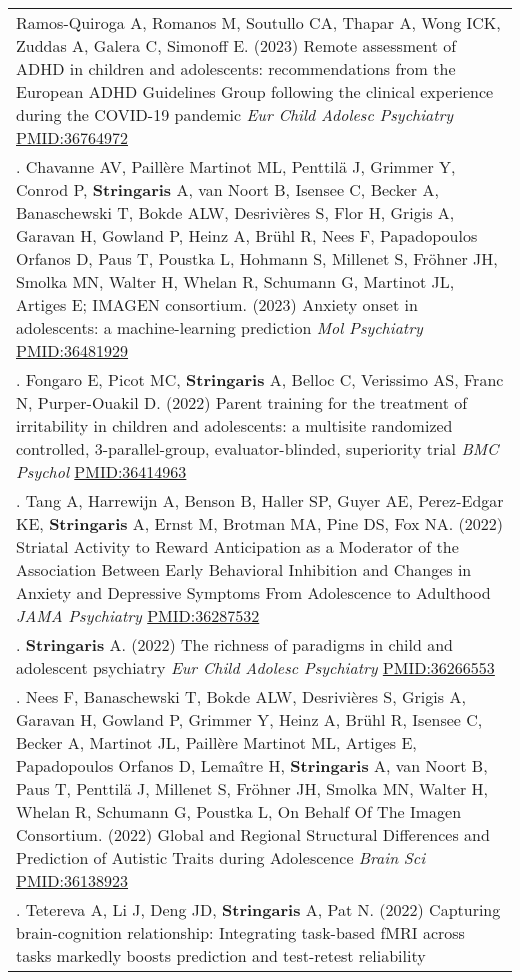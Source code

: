 \documentclass[
]{article}
\begin{document}
\begin{longtable}[]{@{}
  >{\raggedright\arraybackslash}p{}@{}}
Ramos-Quiroga A, Romanos M, Soutullo CA, Thapar A, Wong ICK, Zuddas A,
Galera C, Simonoff E. (2023) Remote assessment of ADHD in children and
adolescents: recommendations from the European ADHD Guidelines Group
following the clinical experience during the COVID-19 pandemic \emph{Eur
Child Adolesc Psychiatry} \url{PMID:36764972} \\
26. Chavanne AV, Paillère Martinot ML, Penttilä J, Grimmer Y, Conrod P,
\textbf{Stringaris} A, van Noort B, Isensee C, Becker A, Banaschewski T,
Bokde ALW, Desrivières S, Flor H, Grigis A, Garavan H, Gowland P, Heinz
A, Brühl R, Nees F, Papadopoulos Orfanos D, Paus T, Poustka L, Hohmann
S, Millenet S, Fröhner JH, Smolka MN, Walter H, Whelan R, Schumann G,
Martinot JL, Artiges E; IMAGEN consortium. (2023) Anxiety onset in
adolescents: a machine-learning prediction \emph{Mol Psychiatry}
\url{PMID:36481929} \\
27. Fongaro E, Picot MC, \textbf{Stringaris} A, Belloc C, Verissimo AS,
Franc N, Purper-Ouakil D. (2022) Parent training for the treatment of
irritability in children and adolescents: a multisite randomized
controlled, 3-parallel-group, evaluator-blinded, superiority trial
\emph{BMC Psychol} \url{PMID:36414963} \\
28. Tang A, Harrewijn A, Benson B, Haller SP, Guyer AE, Perez-Edgar KE,
\textbf{Stringaris} A, Ernst M, Brotman MA, Pine DS, Fox NA. (2022)
Striatal Activity to Reward Anticipation as a Moderator of the
Association Between Early Behavioral Inhibition and Changes in Anxiety
and Depressive Symptoms From Adolescence to Adulthood \emph{JAMA
Psychiatry} \url{PMID:36287532} \\
29. \textbf{Stringaris} A. (2022) The richness of paradigms in child and
adolescent psychiatry \emph{Eur Child Adolesc Psychiatry}
\url{PMID:36266553} \\
30. Nees F, Banaschewski T, Bokde ALW, Desrivières S, Grigis A, Garavan
H, Gowland P, Grimmer Y, Heinz A, Brühl R, Isensee C, Becker A, Martinot
JL, Paillère Martinot ML, Artiges E, Papadopoulos Orfanos D, Lemaître H,
\textbf{Stringaris} A, van Noort B, Paus T, Penttilä J, Millenet S,
Fröhner JH, Smolka MN, Walter H, Whelan R, Schumann G, Poustka L, On
Behalf Of The Imagen Consortium. (2022) Global and Regional Structural
Differences and Prediction of Autistic Traits during Adolescence
\emph{Brain Sci} \url{PMID:36138923} \\
31. Tetereva A, Li J, Deng JD, \textbf{Stringaris} A, Pat N. (2022)
Capturing brain-cognition relationship: Integrating task-based fMRI
across tasks markedly boosts prediction and test-retest reliability

\end{longtable}
\end{document}
